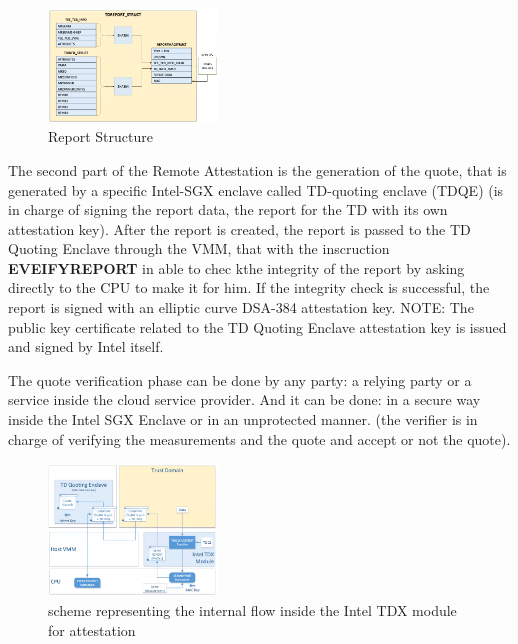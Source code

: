 \begin{figure}[H]
    \centering
    \includegraphics[width=0.4\textwidth]{img/report struct.png}
    \caption{Report Structure}
    \label{fig:report struct}
\end{figure}

The second part of the Remote Attestation is the generation of the quote, that is generated by a specific Intel-SGX enclave called TD-quoting enclave (TDQE) (is in charge of signing the report data, the report for the TD with its own attestation key).
After the report is created, the report is passed to the TD Quoting Enclave through the VMM, that with the inscruction \textbf{EVEIFYREPORT} in able to chec kthe integrity of the report by asking directly to the CPU to make it for him.  If the integrity check is successful, the report is signed with an elliptic curve DSA-384 attestation key. NOTE: The public key certificate related to the TD Quoting Enclave attestation key is issued and signed by Intel itself. \bigskip

The quote verification phase can be done by any party: a relying party or a service inside the cloud service provider. And it can be done: in a secure way inside the Intel SGX Enclave or in an unprotected manner. 
(the verifier is in charge of verifying the measurements and the quote and accept or not the quote).


\begin{figure}[H]
    \centering
    \includegraphics[width=0.4\textwidth]{img/schema tdx attestation.png}
    \caption{scheme representing the internal flow inside the Intel TDX module for attestation}
    \label{fig:schema tdx attestation}
\end{figure}

